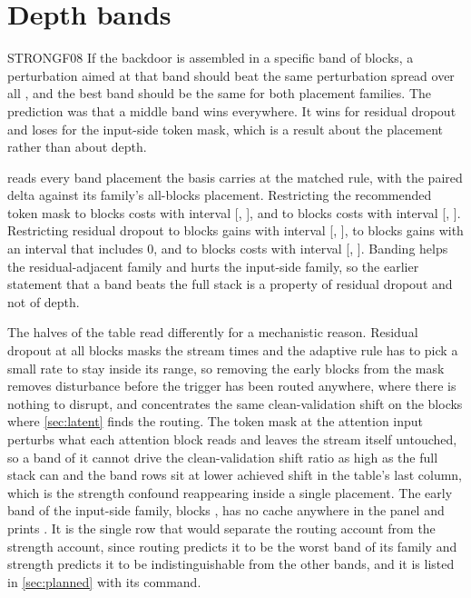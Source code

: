 \documentclass[../main.tex]{subfiles}
\begin{document}
\section{Depth bands}
\label{sec:depth}

\begin{claim}{STRONG}{F08}
If the backdoor is assembled in a specific band of blocks, a perturbation aimed at that band should beat the same perturbation spread over all \VitBlocks{}, and the best band should be the same for both placement families. The prediction was that a middle band wins everywhere. It wins for residual dropout and loses for the input-side token mask, which is a result about the placement rather than about depth.
\end{claim}

 reads every band placement the basis carries at the matched rule, with the paired delta against its family's all-blocks placement. Restricting the recommended token mask to blocks \BandMiddle{} costs \BandFiveEightMinusAllInputSide{} with interval [\BandFiveEightMinusAllInputSideLow{}, \BandFiveEightMinusAllInputSideHigh{}], and to blocks \BandLate{} costs \BandNineOneTwoMinusAllInputSide{} with interval [\BandNineOneTwoMinusAllInputSideLow{}, \BandNineOneTwoMinusAllInputSideHigh{}]. Restricting residual dropout to blocks \BandMiddle{} gains \BandFiveEightMinusAllResidual{} with interval [\BandFiveEightMinusAllResidualLow{}, \BandFiveEightMinusAllResidualHigh{}], to blocks \BandLate{} gains \BandNineOneTwoMinusAllResidual{} with an interval that includes $0$, and to blocks \BandEarly{} costs \BandOneFourMinusAllResidual{} with interval [\BandOneFourMinusAllResidualLow{}, \BandOneFourMinusAllResidualHigh{}]. Banding helps the residual-adjacent family and hurts the input-side family, so the earlier statement that a band beats the full stack is a property of residual dropout and not of depth.



The halves of the table read differently for a mechanistic reason. Residual dropout at all blocks masks the stream \VitBlocks{} times and the adaptive rule has to pick a small rate to stay inside its range, so removing the early blocks from the mask removes disturbance before the trigger has been routed anywhere, where there is nothing to disrupt, and concentrates the same clean-validation shift on the blocks where \cref{sec:latent} finds the routing. The token mask at the attention input perturbs what each attention block reads and leaves the stream itself untouched, so a band of it cannot drive the clean-validation shift ratio as high as the full stack can and the band rows sit at lower achieved shift in the table's last column, which is the strength confound reappearing inside a single placement. The early band of the input-side family, blocks \BandEarly{}, has no cache anywhere in the panel and prints \pending{}. It is the single row that would separate the routing account from the strength account, since routing predicts it to be the worst band of its family and strength predicts it to be indistinguishable from the other bands, and it is listed in \cref{sec:planned} with its command.
\end{document}
